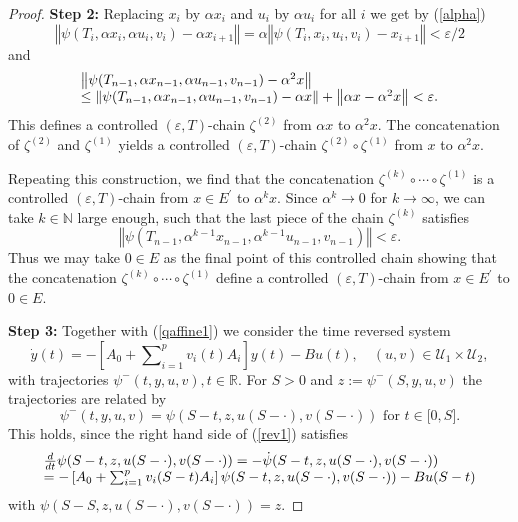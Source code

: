 \begin{proof}
		\textbf{Step 2: }Replacing $x_{i}$ by $\alpha x_{i}$ and $u_{i}$ by $\alpha
		u_{i}$ for all $i$ we get by (\ref{alpha})
		\[
		\left\Vert \psi(T_{i},\alpha x_{i},\alpha u_{i},v_{i})-\alpha x_{i+1}
		\right\Vert =\alpha\left\Vert \psi(T_{i},x_{i},u_{i},v_{i})-x_{i+1}\right\Vert
		<\varepsilon/2
		\]
		and
		\[%
		\begin{array}
			[c]{l}%
			\left\Vert \psi(T_{n-1},\alpha x_{n-1},\alpha u_{n-1},v_{n-1})-\alpha
			^{2}x\right\Vert \\
			\leq\left\Vert \psi(T_{n-1},\alpha x_{n-1},\alpha u_{n-1},v_{n-1})-\alpha
			x\right\Vert +\left\Vert \alpha x-\alpha^{2}x\right\Vert <\varepsilon.
		\end{array}
		\]
		This defines a controlled $(\varepsilon,T)$-chain $\zeta^{(2)}$ from $\alpha
		x$ to $\alpha^{2}x$. The concatenation of $\zeta^{(2)}$ and $\zeta^{(1)}$
		yields a controlled $(\varepsilon,T)$-chain $\zeta^{(2)}\circ\zeta^{(1)}$ from
		$x$ to $\alpha^{2}x$.
		
		Repeating this construction, we find that the concatenation $\zeta^{(k)}%
		\circ\cdots\circ\zeta^{(1)}$ is a controlled $(\varepsilon,T)$-chain from
		$x\in E^{\prime}$ to $\alpha^{k}x$. Since $\alpha^{k}\rightarrow0$ for
		$k\rightarrow\infty$, we can take $k\in\mathbb{N}$ large enough, such that the last piece of the chain $\zeta^{(k)}$ satisfies%
		\[
		\left\Vert \psi(T_{n-1},\alpha^{k-1}x_{n-1},\alpha^{k-1}u_{n-1},v_{n-1}%
		)\right\Vert <\varepsilon.
		\]
		Thus we may take $0\in E$ as the final point of this controlled chain showing
		that the concatenation $\zeta^{(k)}\circ\cdots\circ\zeta^{(1)}$ define a
		controlled $(\varepsilon,T)$-chain from $x\in E^{\prime}$ to $0\in E$.
		
		\textbf{Step 3:} Together with (\ref{qaffine1}) we consider the time reversed
		system
		\begin{equation}
			\dot{y}(t)=-\left[  A_{0}+\sum\nolimits_{i=1}^{p}v_{i}(t)A_{i}\right]
			y(t)-Bu(t),\quad(u,v)\in\mathcal{U}_{1}\times\mathcal{U}_{2},
			\label{time_reversed}%
		\end{equation}
		with trajectories $\psi^{-}(t,y,u,v),t\in\mathbb{R}$. For $S>0$ and
		$z:=\psi^{-}(S,y,u,v)$ the trajectories are related by
		\begin{equation}
			\psi^{-}(t,y,u,v)=\psi(S-t,z,u(S-\cdot),v(S-\cdot))\mbox{ for }t\in
			\lbrack0,S]. \label{rev1}%
		\end{equation}
		This holds, since the right hand side of (\ref{rev1}) satisfies
		\[%
		\begin{array}
			[c]{l}%
			\frac{d}{dt}\psi(S-t,z,u(S-\cdot),v(S-\cdot))=-\dot{\psi}(S-t,z,u(S-\cdot
			),v(S-\cdot))\\
			=-\left[  A_{0}+\sum\nolimits_{i=1}^{p}v_{i}(S-t)A_{i}\right]  \psi
			(S-t,z,u(S-\cdot),v(S-\cdot))-Bu(S-t)
		\end{array}
		\]
		with $\psi(S-S,z,u(S-\cdot),v(S-\cdot))=z$.
		

\end{proof}
